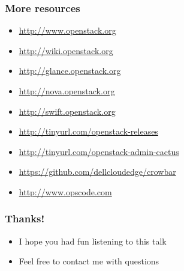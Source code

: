 \documentclass[t]{beamer}
\begin{document}
\begin{frame}
	\frametitle{More resources}
	\begin{itemize}
		\item \url{http://www.openstack.org}
		\item \url{http://wiki.openstack.org}
		\item \url{http://glance.openstack.org}
		\item \url{http://nova.openstack.org}
		\item \url{http://swift.openstack.org}
		\item \url{http://tinyurl.com/openstack-releases}
		\item \url{http://tinyurl.com/openstack-admin-cactus}
		\item \url{https://github.com/dellcloudedge/crowbar}
		\item \url{http://www.opscode.com}
	\end{itemize}
\end{frame}

\begin{frame}
	\frametitle{Thanks!}
	\begin{itemize}
		\item I hope you had fun listening to this talk
		\item Feel free to contact me with questions
	\end{itemize}
\end{frame}
\end{document}
